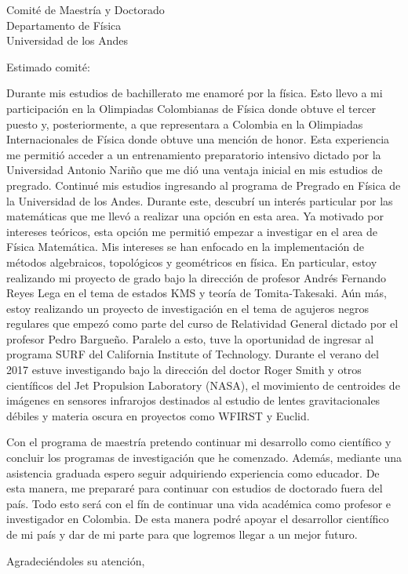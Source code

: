 \documentclass{letter}
\begin{document}
\begin{letter}{Comité de Maestría y Doctorado \\ Departamento de Física \\ Universidad de los Andes}

\opening{Estimado comité:}

Durante mis estudios de bachillerato me enamoré por la física. Esto llevo a mi participación en la Olimpiadas Colombianas de Física donde obtuve el tercer puesto y, posteriormente, a que representara a Colombia en la Olimpiadas Internacionales de Física donde obtuve una mención de honor. Esta experiencia me permitió acceder a un entrenamiento preparatorio intensivo dictado por la Universidad Antonio Nariño que me dió una ventaja inicial en mis estudios de pregrado. Continué mis estudios ingresando al programa de Pregrado en Física de la Universidad de los Andes. Durante este, descubrí un interés particular por las matemáticas que me llevó a realizar una opción en esta area. Ya motivado por intereses teóricos, esta opción me permitió empezar a investigar en el area de Física Matemática. Mis intereses se han enfocado en la implementación de métodos algebraicos, topológicos y geométricos en física. En particular, estoy realizando mi proyecto de grado bajo la dirección de profesor Andrés Fernando Reyes Lega en el tema de estados KMS y teoría de Tomita-Takesaki. Aún más, estoy realizando un proyecto de investigación en el tema de agujeros negros regulares que empezó como parte del curso de Relatividad General dictado por el profesor Pedro Bargueño. Paralelo a esto, tuve la oportunidad de ingresar al programa SURF del California Institute of Technology. Durante el verano del 2017 estuve investigando bajo la dirección del doctor Roger Smith y otros científicos del Jet Propulsion Laboratory (NASA), el movimiento de centroides de imágenes en sensores infrarojos destinados al estudio de lentes gravitacionales débiles y materia oscura en proyectos como WFIRST y Euclid.  

Con el programa de maestría pretendo continuar mi desarrollo como científico y concluir los programas de investigación que he comenzado. Además, mediante una asistencia graduada espero seguir adquiriendo experiencia como educador. De esta manera, me prepararé para continuar con estudios de doctorado fuera del país. Todo esto será con el fín de continuar una vida académica como profesor e investigador en Colombia. De esta manera podré apoyar el desarrollor científico de mi país y dar de mi parte para que logremos llegar a un mejor futuro.

\closing{Agradeciéndoles su atención,}

\end{letter}
\end{document}
